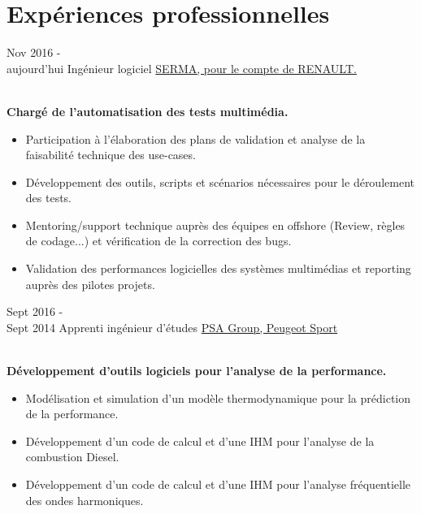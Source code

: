 \documentclass[letterpaper]{twentysecondcv} %
\begin{document}

\section{Expériences professionnelles}

\begin{twenty} %
	\twentyitem
    	{Nov 2016 - \\aujourd'hui}
        {Ingénieur logiciel}
        {\href{http://www.serma-ingenierie.com/}{SERMA, pour le compte de RENAULT.}}
        {}
        {
        {\\ \textbf{Chargé de l'automatisation des tests multimédia.}
        \begin{itemize}
        \item Participation à l'élaboration des plans de validation et analyse de la faisabilité technique des use-cases.
        \item Développement des outils, scripts et scénarios nécessaires pour le déroulement des tests.
        \item Mentoring/support technique auprès des équipes en offshore (Review, règles de codage...) et vérification de la correction des bugs.
        \item Validation des performances logicielles des systèmes multimédias et reporting auprès des pilotes projets.\\
    
    \end{itemize}}
        }
        
    \twentyitem
   		{Sept 2016 - \\Sept 2014 }
        {Apprenti ingénieur d'études}
        {\href{http://media.peugeot-sport.com/}{PSA Group, Peugeot Sport}}
        {}
        {
        {\\ \textbf{Développement d'outils logiciels pour l'analyse de la performance.}
        
        \begin{itemize}
        \item Modélisation et simulation d'un modèle thermodynamique pour la prédiction de la performance. 
        \item Développement d'un code de calcul et d'une IHM pour l'analyse de la combustion Diesel.
        \item Développement d'un code de calcul et d'une IHM pour l'analyse fréquentielle des ondes harmoniques. 
    \end{itemize}}
    
}
\end{twenty}
\end{document}
